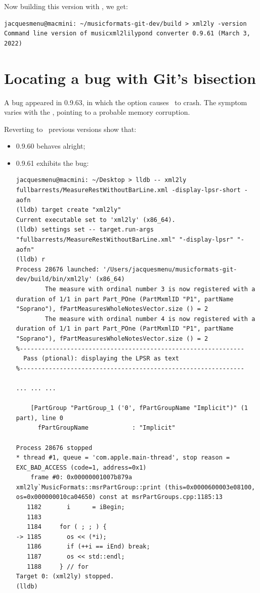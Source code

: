 Now building this version with , we get:
\begin{lstlisting}[language=Terminal]
jacquesmenu@macmini: ~/musicformats-git-dev/build > xml2ly -version
Command line version of musicxml2lilypond converter 0.9.61 (March 3, 2022)
\end{lstlisting}


\chapter{Locating a bug with Git's bisection}

A bug appeared in 0.9.63, in which the  option causes \xmlToLy\ to crash.
The symptom varies with the \OS, pointing to a probable memory corruption.

Reverting to \mf\ previous versions show that:
\begin{itemize}
\item 0.9.60 behaves alright;
\item 0.9.61 exhibits the bug:

\begin{lstlisting}[language=Terminal]
jacquesmenu@macmini: ~/Desktop > lldb -- xml2ly  fullbarrests/MeasureRestWithoutBarLine.xml -display-lpsr-short -aofn
(lldb) target create "xml2ly"
Current executable set to 'xml2ly' (x86_64).
(lldb) settings set -- target.run-args  "fullbarrests/MeasureRestWithoutBarLine.xml" "-display-lpsr" "-aofn"
(lldb) r
Process 28676 launched: '/Users/jacquesmenu/musicformats-git-dev/build/bin/xml2ly' (x86_64)
        The measure with ordinal number 3 is now registered with a duration of 1/1 in part Part_POne (PartMxmlID "P1", partName "Soprano"), fPartMeasuresWholeNotesVector.size () = 2
        The measure with ordinal number 4 is now registered with a duration of 1/1 in part Part_POne (PartMxmlID "P1", partName "Soprano"), fPartMeasuresWholeNotesVector.size () = 2
%--------------------------------------------------------------
  Pass (ptional): displaying the LPSR as text
%--------------------------------------------------------------

... ... ...

    [PartGroup "PartGroup_1 ('0', fPartGroupName "Implicit")" (1 part), line 0
      fPartGroupName            : "Implicit"

Process 28676 stopped
* thread #1, queue = 'com.apple.main-thread', stop reason = EXC_BAD_ACCESS (code=1, address=0x1)
    frame #0: 0x00000001007b879a xml2ly`MusicFormats::msrPartGroup::print (this=0x0000600003e08100, os=0x000000010ca04650) const at msrPartGroups.cpp:1185:13
   1182	      i      = iBegin;
   1183
   1184	    for ( ; ; ) {
-> 1185	      os << (*i);
   1186	      if (++i == iEnd) break;
   1187	      os << std::endl;
   1188	    } // for
Target 0: (xml2ly) stopped.
(lldb)
\end{lstlisting}

\end{itemize}


